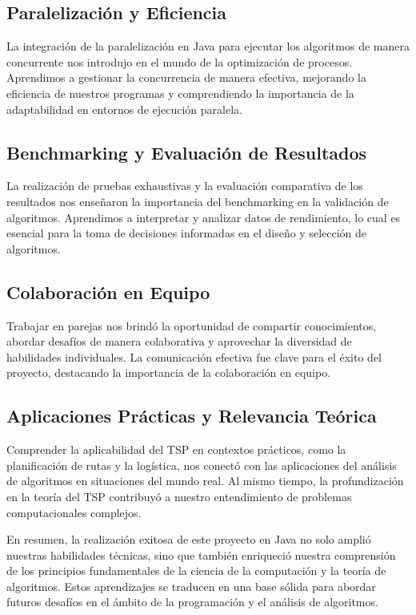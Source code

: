 \documentclass{article}
\begin{document}
	\subsection{Paralelización y Eficiencia}
	
	La integración de la paralelización en Java para ejecutar los algoritmos de manera concurrente nos introdujo en el mundo de la optimización de procesos. Aprendimos a gestionar la concurrencia de manera efectiva, mejorando la eficiencia de nuestros programas y comprendiendo la importancia de la adaptabilidad en entornos de ejecución paralela.
	
	\subsection{Benchmarking y Evaluación de Resultados}
	
	La realización de pruebas exhaustivas y la evaluación comparativa de los resultados nos enseñaron la importancia del benchmarking en la validación de algoritmos. Aprendimos a interpretar y analizar datos de rendimiento, lo cual es esencial para la toma de decisiones informadas en el diseño y selección de algoritmos.
	
	\subsection{Colaboración en Equipo}
	
	Trabajar en parejas nos brindó la oportunidad de compartir conocimientos, abordar desafíos de manera colaborativa y aprovechar la diversidad de habilidades individuales. La comunicación efectiva fue clave para el éxito del proyecto, destacando la importancia de la colaboración en equipo.
	
	\subsection{Aplicaciones Prácticas y Relevancia Teórica}
	
	Comprender la aplicabilidad del TSP en contextos prácticos, como la planificación de rutas y la logística, nos conectó con las aplicaciones del análisis de algoritmos en situaciones del mundo real. Al mismo tiempo, la profundización en la teoría del TSP contribuyó a nuestro entendimiento de problemas computacionales complejos.
	
	En resumen, la realización exitosa de este proyecto en Java no solo amplió nuestras habilidades técnicas, sino que también enriqueció nuestra comprensión de los principios fundamentales de la ciencia de la computación y la teoría de algoritmos. Estos aprendizajes se traducen en una base sólida para abordar futuros desafíos en el ámbito de la programación y el análisis de algoritmos.
	
\end{document}
